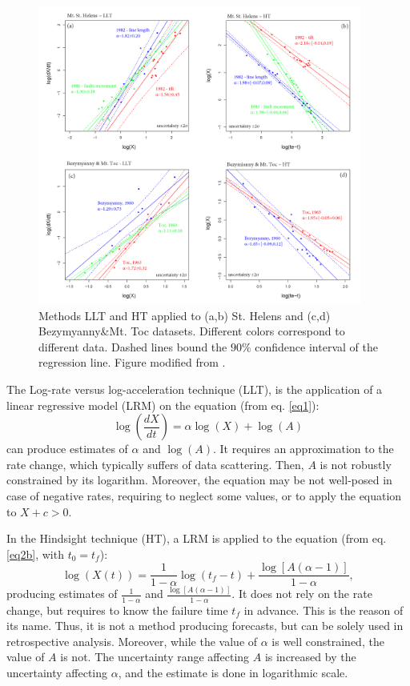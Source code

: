 \documentclass{article}
\begin{document}
\begin{figure}[H]
\centering
\includegraphics[width=0.95\textwidth]{Fig4_plus.png}
\vskip-0.5cm\caption{Methods LLT and HT applied to (a,b) St. Helens and (c,d) Bezymyanny\&Mt. Toc datasets. Different colors correspond to different data. Dashed lines bound the $90\%$ confidence interval of the regression line. Figure modified from \cite{Voight1988}.}
\label{Fig4}
\end{figure}

The Log-rate versus log-acceleration technique (LLT), is the application of a linear regressive model (LRM) on the equation (from eq. \ref{eq1}):
$$\log\left(\frac{dX}{dt}\right)=\alpha\log(X)+\log(A)$$
can produce estimates of $\alpha$ and $\log(A)$. It requires an approximation to the rate change, which typically suffers of data scattering. Then, $A$ is not robustly constrained by its logarithm. Moreover, the equation may be not well-posed in case of negative rates, requiring to neglect some values, or to apply the equation to $X+c > 0$.

In the Hindsight technique (HT), a LRM is applied to the equation (from eq. \ref{eq2b}, with $t_0=t_f$):
$$\log(X(t))=\frac{1}{1-\alpha}\log(t_f-t)+\frac{\log[A(\alpha-1)]}{1-\alpha},$$
producing estimates of $\frac{1}{1-\alpha}$ and $\frac{\log[A(\alpha-1)]}{1-\alpha}$. It does not rely on the rate change, but requires to know the failure time $t_f$ in advance. This is the reason of its name. Thus, it is not a method producing forecasts, but can be solely used in retrospective analysis. Moreover, while the value of $\alpha$ is well constrained, the value of $A$ is not. The uncertainty range affecting $A$ is increased by the uncertainty affecting $\alpha$, and the estimate is done in logarithmic scale.
\end{document}
